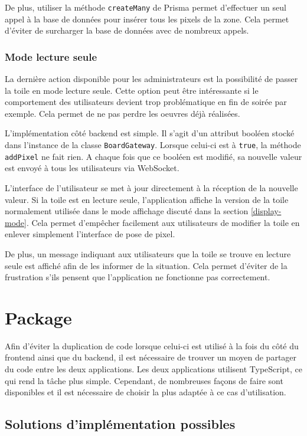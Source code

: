 De plus, utiliser la méthode \texttt{createMany} de Prisma permet d'effectuer un seul appel à la base de données pour insérer tous les pixels de la zone. Cela permet d'éviter de surcharger la base de données avec de nombreux appels.

\subsubsection{Mode lecture seule}

La dernière action disponible pour les administrateurs est la possibilité de passer la toile en mode lecture seule. Cette option peut être intéressante si le comportement des utilisateurs devient trop problématique en fin de soirée par exemple. Cela permet de ne pas perdre les oeuvres déjà réalisées.

L'implémentation côté backend est simple. Il s'agit d'un attribut booléen stocké dans l'instance de la classe \texttt{BoardGateway}. Lorsque celui-ci est à \texttt{true}, la méthode \texttt{addPixel} ne fait rien. A chaque fois que ce booléen est modifié, sa nouvelle valeur est envoyé à tous les utilisateurs via WebSocket.

L'interface de l'utilisateur se met à jour directement à la réception de la nouvelle valeur. Si la toile est en lecture seule, l'application affiche la version de la toile normalement utilisée dans le mode affichage discuté dans la section \ref{display-mode}. Cela permet d'empêcher facilement aux utilisateurs de modifier la toile en enlever simplement l'interface de pose de pixel.

De plus, un message indiquant aux utilisateurs que la toile se trouve en lecture seule est affiché afin de les informer de la situation. Cela permet d'éviter de la frustration s'ils pensent que l'application ne fonctionne pas correctement.

\section{Package}

Afin d'éviter la duplication de code lorsque celui-ci est utilisé à la fois du côté du frontend ainsi que du backend, il est nécessaire de trouver un moyen de partager du code entre les deux applications. Les deux applications utilisent TypeScript, ce qui rend la tâche plus simple. Cependant, de nombreuses façons de faire sont disponibles et il est nécessaire de choisir la plus adaptée à ce cas d'utilisation.

\subsection{Solutions d'implémentation possibles}

